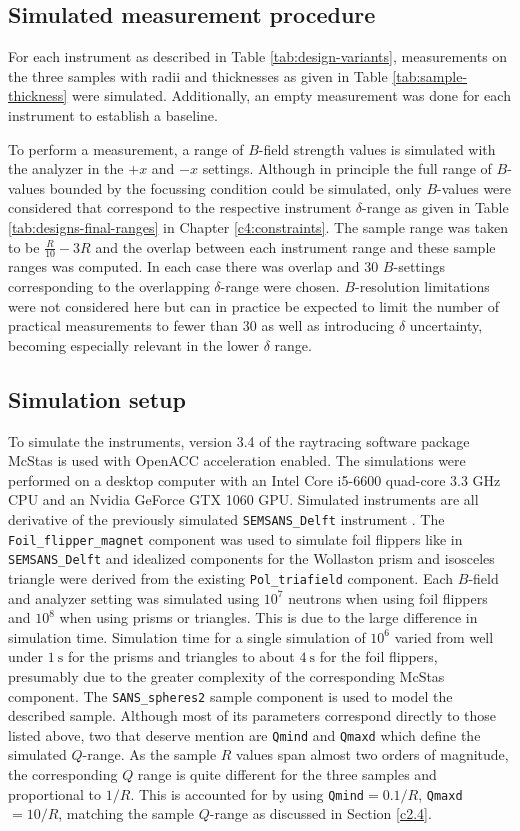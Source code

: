 \subsection{Simulated measurement procedure}
For each instrument as described in Table \ref{tab:design-variants}, measurements on the three samples with radii and thicknesses as given in Table \ref{tab:sample-thickness} were simulated. Additionally, an empty measurement was done for each instrument to establish a baseline. 

To perform a measurement, a range of $B$-field strength values is simulated with the analyzer in the $+x$ and $-x$ settings. Although in principle the full range of $B$-values bounded by the focussing condition could be simulated, only $B$-values were considered that correspond to the respective instrument $\delta$-range as given in Table \ref{tab:designs-final-ranges} in Chapter \ref{c4:constraints}. The sample range was taken to be $\frac{R}{10} - 3R$ and the overlap between each instrument range and these sample ranges was computed. In each case there was overlap and 30 $B$-settings corresponding to the overlapping $\delta$-range were chosen. $B$-resolution limitations were not considered here but can in practice be expected to limit the number of practical measurements to fewer than 30 as well as introducing $\delta$ uncertainty, becoming especially relevant in the lower $\delta$ range. 

\subsection{Simulation setup}
To simulate the instruments, version 3.4 of the raytracing software package McStas \cite{willendrup2020} is used with OpenACC acceleration enabled. The simulations were performed on a desktop computer with an Intel Core i5-6600 quad-core 3.3 GHz CPU and an Nvidia GeForce GTX 1060 GPU. Simulated instruments are all derivative of the previously simulated \texttt{SEMSANS\_Delft} instrument \cite{bouwman2021b}. The \texttt{Foil\_flipper\_magnet} component was used to simulate foil flippers like in \texttt{SEMSANS\_Delft} and idealized components for the Wollaston prism and isosceles triangle were derived from the existing \texttt{Pol\_triafield} component. Each $B$-field and analyzer setting was simulated using $10^7$ neutrons when using foil flippers and $10^8$ when using prisms or triangles. This is due to the large difference in simulation time. Simulation time for a single simulation of $10^6$ varied from well under $\SI{1}{\second}$ for the prisms and triangles to about $\SI{4}{\second}$ for the foil flippers, presumably due to the greater complexity of the corresponding McStas component. 
The \texttt{SANS\_spheres2} sample component is used to model the described sample. Although most of its parameters correspond directly to those listed above, two that deserve mention are \texttt{Qmind} and \texttt{Qmaxd} which define the simulated $Q$-range. As the sample $R$ values span almost two orders of magnitude, the corresponding $Q$ range is quite different for the three samples and proportional to $1/R$. This is accounted for by using \texttt{Qmind}$=0.1/R$, \texttt{Qmaxd}$=10/R$, matching the sample $Q$-range as discussed in Section \ref{c2.4}.

